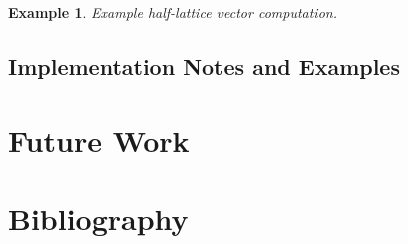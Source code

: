 \documentclass[12pt]{article}
\theoremstyle{definition}
\newtheorem{example}[theorem]{Example}
\begin{document}
\begin{example}
  {\it Example half-lattice vector computation.}
\end{example}



\subsection{Implementation Notes and Examples}




\section{Future Work}





\section{Bibliography}




\end{document}
